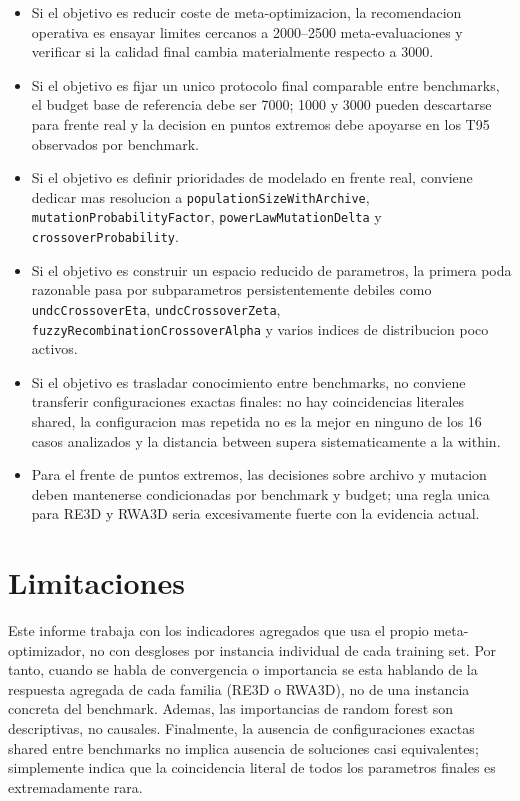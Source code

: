 \documentclass[11pt,a4paper]{article}
\begin{document}
\begin{itemize}

\item Si el objetivo es reducir coste de meta-optimizacion, la recomendacion operativa es ensayar limites cercanos a 2000--2500 meta-evaluaciones y verificar si la calidad final cambia materialmente respecto a 3000.

\item Si el objetivo es fijar un unico protocolo final comparable entre benchmarks, el budget base de referencia debe ser 7000; 1000 y 3000 pueden descartarse para frente real y la decision en puntos extremos debe apoyarse en los T95 observados por benchmark.

\item Si el objetivo es definir prioridades de modelado en frente real, conviene dedicar mas resolucion a \texttt{populationSizeWithArchive}, \texttt{mutationProbabilityFactor}, \texttt{powerLawMutationDelta} y \texttt{crossoverProbability}.

\item Si el objetivo es construir un espacio reducido de parametros, la primera poda razonable pasa por subparametros persistentemente debiles como \texttt{undcCrossoverEta}, \texttt{undcCrossoverZeta}, \texttt{fuzzyRecombinationCrossoverAlpha} y varios indices de distribucion poco activos.

\item Si el objetivo es trasladar conocimiento entre benchmarks, no conviene transferir configuraciones exactas finales: no hay coincidencias literales shared, la configuracion mas repetida no es la mejor en ninguno de los 16 casos analizados y la distancia between supera sistematicamente a la within.

\item Para el frente de puntos extremos, las decisiones sobre archivo y mutacion deben mantenerse condicionadas por benchmark y budget; una regla unica para RE3D y RWA3D seria excesivamente fuerte con la evidencia actual.

\end{itemize}

\section{Limitaciones}

Este informe trabaja con los indicadores agregados que usa el propio meta-optimizador, no con desgloses por instancia individual de cada training set. Por tanto, cuando se habla de convergencia o importancia se esta hablando de la respuesta agregada de cada familia (RE3D o RWA3D), no de una instancia concreta del benchmark. Ademas, las importancias de random forest son descriptivas, no causales. Finalmente, la ausencia de configuraciones exactas shared entre benchmarks no implica ausencia de soluciones casi equivalentes; simplemente indica que la coincidencia literal de todos los parametros finales es extremadamente rara.
\end{document}
